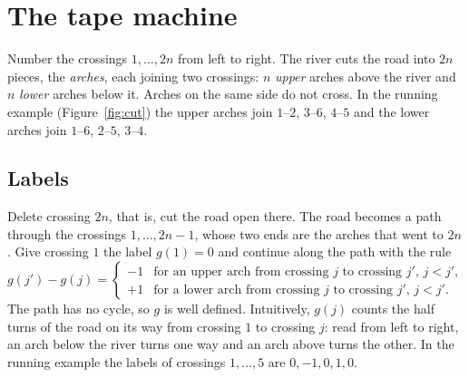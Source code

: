 \section{The tape machine}\label{sec:tape}

Number the crossings $1,\ldots,2n$ from left to right. The river cuts the road into $2n$ pieces, the \emph{arches},
each joining two crossings: $n$ \emph{upper} arches above the river and $n$ \emph{lower} arches below it. Arches on the
same side do not cross. In the running example
(Figure~\ref{fig:cut}) the upper arches join $1$--$2$, $3$--$6$, $4$--$5$ and the lower arches join $1$--$6$,
$2$--$5$, $3$--$4$.

\subsection{Labels}

Delete crossing $2n$, that is, cut the road open there. The road becomes a path through the crossings
$1,\ldots,2n-1$, whose two ends are the arches that went to $2n$. Give crossing $1$ the label $g(1)=0$ and continue
along the path with the rule
\begin{equation}\label{eq:arch}
  g(j')-g(j)=\begin{cases}-1&\text{for an upper arch from crossing $j$ to crossing $j'$, $j<j'$},\\ +1&\text{for a lower arch from crossing $j$ to crossing $j'$, $j<j'$}.\end{cases}
\end{equation}
The path has no cycle, so $g$ is well defined. Intuitively, $g(j)$ counts the half turns of the road on its way from
crossing $1$ to crossing $j$: read from left to right, an arch below the river turns one way and an arch above turns
the other. In the running example the labels of crossings $1,\ldots,5$ are $0,-1,0,1,0$.

